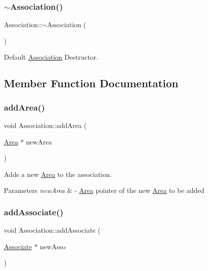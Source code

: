 \subsubsection{\texorpdfstring{$\sim$\+Association()}{~Association()}}
{\footnotesize\ttfamily Association\+::$\sim$\+Association (\begin{DoxyParamCaption}{ }\end{DoxyParamCaption})\hspace{0.3cm}{\ttfamily [virtual]}}



Default \hyperlink{classAssociation}{Association} Destructor. 



\subsection{Member Function Documentation}
\mbox{\label{classAssociation_a33ebf26ce910d02ce8a702e4ff86551b}} 
\subsubsection{\texorpdfstring{add\+Area()}{addArea()}}
{\footnotesize\ttfamily void Association\+::add\+Area (\begin{DoxyParamCaption}\item[{\hyperlink{classArea}{Area} $\ast$}]{new\+Area }\end{DoxyParamCaption})}



Adds a new \hyperlink{classArea}{Area} to the association. 


\begin{DoxyParams}{Parameters}
{\em new\+Area} & -\/ \hyperlink{classArea}{Area} pointer of the new \hyperlink{classArea}{Area} to be added \\
\hline
\end{DoxyParams}
\mbox{\label{classAssociation_ac77af0215fb992c31d4a048a00f642b9}} 
\subsubsection{\texorpdfstring{add\+Associate()}{addAssociate()}}
{\footnotesize\ttfamily void Association\+::add\+Associate (\begin{DoxyParamCaption}\item[{\hyperlink{classAssociate}{Associate} $\ast$}]{new\+Asso }\end{DoxyParamCaption})}



